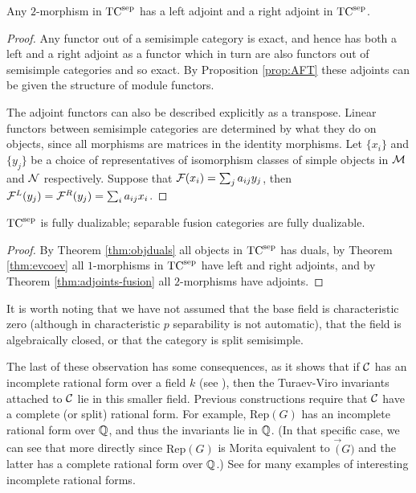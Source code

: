 \documentclass{amsart}
\begin{document}
\begin{theorem} \label{thm:adjoints-fusion}
Any $2$-morphism in ${\mathrm{TC}^{\text{sep}}}$ has a left adjoint and a right adjoint in ${\mathrm{TC}^{\text{sep}}}$.
\end{theorem}
\begin{proof}
Any functor out of a semisimple category is exact, and hence has both a left and a right adjoint as a functor which in turn are also functors out of semisimple categories and so exact.  By Proposition \ref{prop:AFT} these adjoints can be given the structure of module functors.

The adjoint functors can also be described explicitly as a transpose.  Linear functors between semisimple categories are determined by what they do on objects, since all morphisms are matrices in the identity morphisms.  Let $\{x_i\}$ and $\{y_j\}$ be a choice of representatives of isomorphism classes of simple objects in $\mathcal M$ and $\mathcal N$ respectively.  Suppose that $\mathcal F(x_i) = \sum_j a_{ij} y_j$, then $\mathcal F^L(y_j) = \mathcal F^R(y_j) = \sum_i a_{ij} x_i$. 
\end{proof}

\begin{theorem}  \label{thm:TC-dualizable}
 ${\mathrm{TC}^{\text{sep}}}$ is fully dualizable; separable fusion categories are fully dualizable.
\end{theorem}
\begin{proof}
By Theorem \ref{thm:objduals} all objects in ${\mathrm{TC}^{\text{sep}}}$ has duals, by Theorem \ref{thm:evcoev} all $1$-morphisms in ${\mathrm{TC}^{\text{sep}}}$ have left and right adjoints, and by Theorem \ref{thm:adjoints-fusion} all $2$-morphisms have adjoints.
\end{proof}


\begin{remark}
It is worth noting that we have not assumed that the base field is characteristic zero (although in characteristic $p$ separability is not automatic), that the field is algebraically closed, or that the category is split semisimple.  

The last of these observation has some consequences, as it shows that if $\mathcal C$ has an incomplete rational form over a field $k$ (see \cite{1002.0168}), then the Turaev-Viro invariants attached to $\mathcal C$ lie in this smaller field.  Previous constructions require that $\mathcal C$ have a complete (or split) rational form.  For example, $\mathrm{Rep}(G)$ has an incomplete rational form over $\mathbb Q$, and thus the invariants lie in $\mathbb Q$.  (In that specific case, we can see that more directly since $\mathrm{Rep}(G)$ is Morita equivalent to $\Vec(G)$ and the latter has a complete rational form over $\mathbb Q$.)  See \cite{1102.0657} for many examples of interesting incomplete rational forms.
\end{remark}
\end{document}
